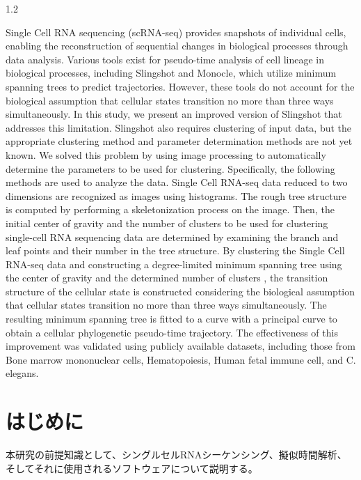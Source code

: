 \documentclass[dvipdfmx,11pt]{kuisthesis}
\begin{document}
\begin{spacing}{1.2}
\begin{eabstract}				%
  Single Cell RNA sequencing (scRNA-seq) provides snapshots of individual cells, enabling the reconstruction of sequential changes in biological processes through data analysis. 
  Various tools exist for pseudo-time analysis of cell lineage in biological processes, including Slingshot and Monocle, which utilize minimum spanning trees to predict trajectories. 
  However, these tools do not account for the biological assumption that cellular states transition no more than three ways simultaneously.
  In this study, we present an improved version of Slingshot that addresses this limitation. 
  Slingshot also requires clustering of input data, but the appropriate clustering method and parameter determination methods are not yet known.
We solved this problem by using image processing to automatically determine the parameters to be used for clustering.
Specifically, the following methods are used to analyze the data.
  Single Cell RNA-seq data reduced to two dimensions are recognized as images using histograms.
  The rough tree structure is computed by performing a skeletonization process on the image.
  Then, the initial center of gravity and the number of clusters to be used for clustering single-cell RNA sequencing data are determined by examining the branch and leaf points and their number in the tree structure.
  By clustering the Single Cell RNA-seq data and constructing a degree-limited minimum spanning tree using the center of gravity and the determined number of clusters
  , the transition structure of the cellular state is constructed considering the biological assumption that cellular states transition no more than three ways simultaneously.
  The resulting minimum spanning tree is fitted to a curve with a principal curve to obtain a cellular phylogenetic pseudo-time trajectory.
  The effectiveness of this improvement was validated using publicly available datasets, including those from Bone marrow mononuclear cells, Hematopoiesis, Human fetal immune cell, and C. elegans.
  
\end{eabstract}

\tableofcontents				%

\section{はじめに}\label{sec-intro}		%
本研究の前提知識として、シングルセルRNAシーケンシング、擬似時間解析、そしてそれに使用されるソフトウェアについて説明する。


\end{spacing}
\end{document}
